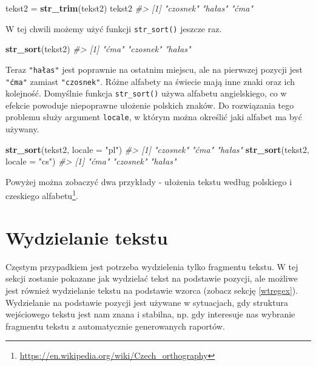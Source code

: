 \documentclass[paper=6in:9in,pagesize=pdftex,headinclude=on,footinclude=on,10pt]{scrbook}
\newenvironment{Shaded}{\begin{snugshade}}{\end{snugshade}}
\newcommand{\CommentTok}[1]{\textcolor[rgb]{0.56,0.35,0.01}{\textit{#1}}}
\newcommand{\DataTypeTok}[1]{\textcolor[rgb]{0.13,0.29,0.53}{#1}}
\newcommand{\KeywordTok}[1]{\textcolor[rgb]{0.13,0.29,0.53}{\textbf{#1}}}
\newcommand{\NormalTok}[1]{#1}
\newcommand{\StringTok}[1]{\textcolor[rgb]{0.31,0.60,0.02}{#1}}
\begin{document}
\begin{Shaded}
\begin{Highlighting}[]
\NormalTok{tekst2 =}\StringTok{ }\KeywordTok{str_trim}\NormalTok{(tekst2)}
\NormalTok{tekst2}
\CommentTok{#> [1] "czosnek" "hałas"   "ćma"}
\end{Highlighting}
\end{Shaded}

W tej chwili możemy użyć funkcji \texttt{str\_sort()} jeszcze raz.

\begin{Shaded}
\begin{Highlighting}[]
\KeywordTok{str_sort}\NormalTok{(tekst2)}
\CommentTok{#> [1] "ćma"     "czosnek" "hałas"}
\end{Highlighting}
\end{Shaded}

Teraz \texttt{"hałas"} jest poprawnie na ostatnim miejscu, ale na pierwszej pozycji jest \texttt{"ćma"} zamiast \texttt{"czosnek"}.
Różne alfabety na świecie mają inne znaki oraz ich kolejność.
Domyślnie funkcja \texttt{str\_sort()} używa alfabetu angielskiego, co w efekcie powoduje niepoprawne ułożenie polskich znaków.
Do rozwiązania tego problemu służy argument \texttt{locale}, w którym można określić jaki alfabet ma być używany.

\begin{Shaded}
\begin{Highlighting}[]
\KeywordTok{str_sort}\NormalTok{(tekst2, }\DataTypeTok{locale =} \StringTok{"pl"}\NormalTok{)}
\CommentTok{#> [1] "czosnek" "ćma"     "hałas"}
\KeywordTok{str_sort}\NormalTok{(tekst2, }\DataTypeTok{locale =} \StringTok{"cs"}\NormalTok{)}
\CommentTok{#> [1] "ćma"     "czosnek" "hałas"}
\end{Highlighting}
\end{Shaded}

Powyżej można zobaczyć dwa przykłady - ułożenia tekstu według polskiego i czeskiego alfabetu\footnote{\url{https://en.wikipedia.org/wiki/Czech_orthography}}.

\hypertarget{wt}{%
\section{Wydzielanie tekstu}\label{wt}}

Częstym przypadkiem jest potrzeba wydzielenia tylko fragmentu tekstu.
W tej sekcji zostanie pokazane jak wydzielać tekst na podstawie pozycji, ale możliwe jest również wydzielanie tekstu na podstawie wzorca (zobacz sekcję \ref{wtregex}).
Wydzielanie na podstawie pozycji jest używane w sytuacjach, gdy struktura wejściowego tekstu jest nam znana i stabilna, np. gdy interesuje nas wybranie fragmentu tekstu z automatycznie generowanych raportów.
\end{document}
